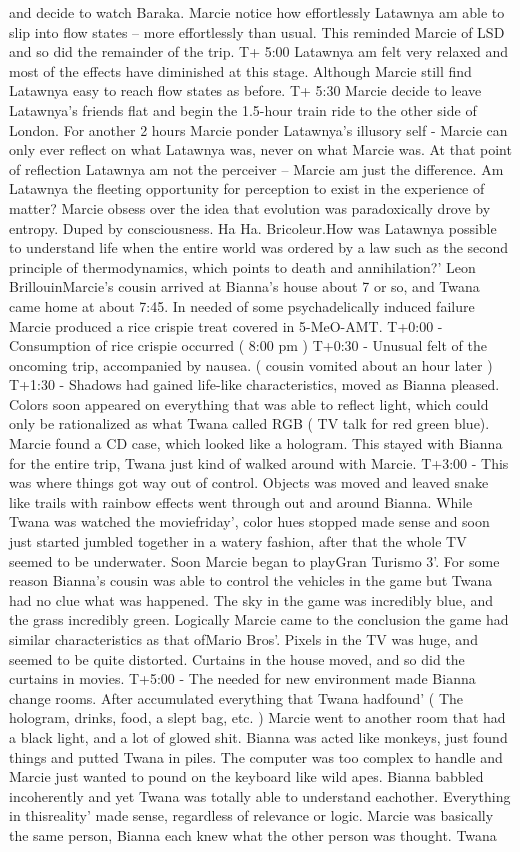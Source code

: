 \documentclass[12pt]{book}
\begin{document}
and decide to watch Baraka. Marcie notice how effortlessly Latawnya am able to slip into flow states -- more effortlessly than usual. This reminded Marcie of LSD and so did the remainder of the trip. T+ 5:00 Latawnya am felt very relaxed and most of the effects have diminished at this stage. Although Marcie still find Latawnya easy to reach flow states as before. T+ 5:30 Marcie decide to leave Latawnya's friends flat and begin the 1.5-hour train ride to the other side of London. For another 2 hours Marcie ponder Latawnya's illusory self - Marcie can only ever reflect on what Latawnya was, never on what Marcie was. At that point of reflection Latawnya am not the perceiver -- Marcie am just the difference. Am Latawnya the fleeting opportunity for perception to exist in the experience of matter? Marcie obsess over the idea that evolution was paradoxically drove by entropy. Duped by consciousness. Ha Ha. Bricoleur.How was Latawnya possible to understand life when the entire world was ordered by a law such as the second principle of thermodynamics, which points to death and annihilation?' Leon BrillouinMarcie's cousin arrived at Bianna's house about 7 or so, and Twana came home at about 7:45. In needed of some psychadelically induced failure Marcie produced a rice crispie treat covered in 5-MeO-AMT. T+0:00 - Consumption of rice crispie occurred ( 8:00 pm ) T+0:30 - Unusual felt of the oncoming trip, accompanied by nausea. ( cousin vomited about an hour later ) T+1:30 - Shadows had gained life-like characteristics, moved as Bianna pleased. Colors soon appeared on everything that was able to reflect light, which could only be rationalized as what Twana called RGB ( TV talk for red green blue). Marcie found a CD case, which looked like a hologram. This stayed with Bianna for the entire trip, Twana just kind of walked around with Marcie. T+3:00 - This was where things got way out of control. Objects was moved and leaved snake like trails with rainbow effects went through out and around Bianna. While Twana was watched the moviefriday', color hues stopped made sense and soon just started jumbled together in a watery fashion, after that the whole TV seemed to be underwater. Soon Marcie began to playGran Turismo 3'. For some reason Bianna's cousin was able to control the vehicles in the game but Twana had no clue what was happened. The sky in the game was incredibly blue, and the grass incredibly green. Logically Marcie came to the conclusion the game had similar characteristics as that ofMario Bros'. Pixels in the TV was huge, and seemed to be quite distorted. Curtains in the house moved, and so did the curtains in movies. T+5:00 - The needed for new environment made Bianna change rooms. After accumulated everything that Twana hadfound' ( The hologram, drinks, food, a slept bag, etc. ) Marcie went to another room that had a black light, and a lot of glowed shit. Bianna was acted like monkeys, just found things and putted Twana in piles. The computer was too complex to handle and Marcie just wanted to pound on the keyboard like wild apes. Bianna babbled incoherently and yet Twana was totally able to understand eachother. Everything in thisreality' made sense, regardless of relevance or logic. Marcie was basically the same person, Bianna each knew what the other person was thought. Twana 
\end{document}
